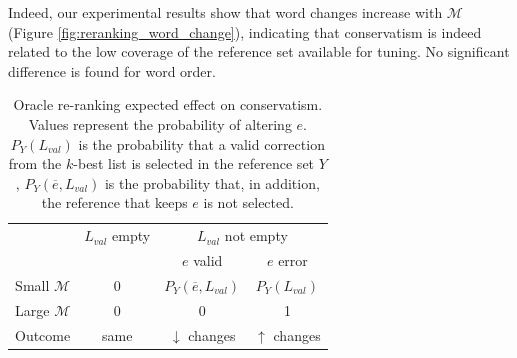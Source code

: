 \documentclass[letterpaper, 11pt]{article}
\begin{document}
Indeed, our experimental results show that word changes increase with $\mathcal{M}$ (Figure \ref{fig:reranking_word_change}),
indicating that conservatism is indeed related to the low coverage of the reference set available for tuning.
No significant difference is found for word order.

\begin{table}[t]
	\vspace{-0.5cm}
	\centering
	\small
	\singlespacing
	\begin{tabular}{c|c|cc}
		 & $L_{val}$ empty & \multicolumn{2}{c}{$L_{val}$ not empty} \\
		&            & $e$ valid & $e$ error \\ \hline
		\multicolumn{1}{c|}{Small $\mathcal{M}$} & 0 & $P_Y(\overline{e}, L_{val})$ & $P_Y\left(L_{val}\right)$    \\
		\multicolumn{1}{c|}{Large $\mathcal{M}$} & 0 & 0              & 1                  \\ \hline
		\multicolumn{1}{c|}{Outcome}            & same  & $\downarrow$ changes        & $\uparrow$ changes
	\end{tabular}
	\caption{\label{ta:oracle_expected_results}
	Oracle re-ranking expected effect on conservatism.
	Values represent the probability of altering $e$. $P_Y\left(L_{val}\right)$ is the probability that a valid correction from the
	$k$-best list is selected in the reference set $Y$,
	$P_Y(\overline{e}, L_{val})$ is the probability that, in addition, the reference that keeps $e$ is not selected.
	}
	

\end{table}
%
\end{document}
